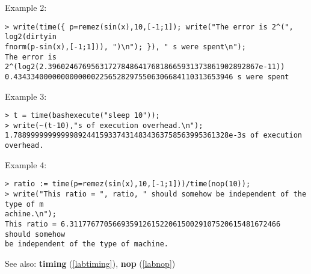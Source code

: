 \noindent Example 2: 
\begin{center}\begin{minipage}{15cm}\begin{Verbatim}[frame=single]
> write(time({ p=remez(sin(x),10,[-1;1]); write("The error is 2^(", log2(dirtyin
fnorm(p-sin(x),[-1;1])), ")\n"); }), " s were spent\n");
The error is 2^(log2(2.3960246769563172784864176818665931373861902892867e-11))
0.434334000000000000022565282975506306684110313653946 s were spent
\end{Verbatim}
\end{minipage}\end{center}
\noindent Example 3: 
\begin{center}\begin{minipage}{15cm}\begin{Verbatim}[frame=single]
> t = time(bashexecute("sleep 10"));
> write(~(t-10),"s of execution overhead.\n");
1.78899999999999892441593374314834363758563995361328e-3s of execution overhead.
\end{Verbatim}
\end{minipage}\end{center}
\noindent Example 4: 
\begin{center}\begin{minipage}{15cm}\begin{Verbatim}[frame=single]
> ratio := time(p=remez(sin(x),10,[-1;1]))/time(nop(10));
> write("This ratio = ", ratio, " should somehow be independent of the type of m
achine.\n");
This ratio = 6.3117767705669359126152206150029107520615481672466 should somehow 
be independent of the type of machine.
\end{Verbatim}
\end{minipage}\end{center}
See also: \textbf{timing} (\ref{labtiming}), \textbf{nop} (\ref{labnop})
